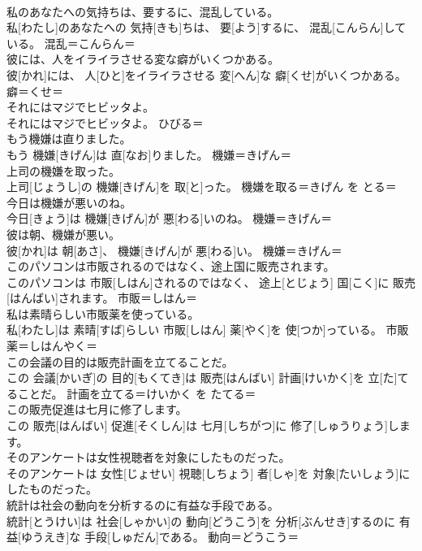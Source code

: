 \documentclass[8pt]{extreport}
\begin{document}
\begin{CJK}{UTF8}{min}
\\	私のあなたへの気持ちは、要するに、混乱している。	
\\	私[わたし]のあなたへの 気持[きも]ちは、 要[よう]するに、 混乱[こんらん]している。	混乱＝こんらん＝ 
\\	彼には、人をイライラさせる変な癖がいくつかある。	
\\	彼[かれ]には、 人[ひと]をイライラさせる 変[へん]な 癖[くせ]がいくつかある。	癖＝くせ＝ 
\\	それにはマジでヒビッタよ。	
\\	それにはマジでヒビッタよ。	ひびる＝ 
\\	もう機嫌は直りました。	
\\	もう 機嫌[きげん]は 直[なお]りました。	機嫌＝きげん＝ 
\\	上司の機嫌を取った。	
\\	上司[じょうし]の 機嫌[きげん]を 取[と]った。	機嫌を取る＝きげん を とる＝ 
\\	今日は機嫌が悪いのね。	
\\	今日[きょう]は 機嫌[きげん]が 悪[わる]いのね。	機嫌＝きげん＝ 
\\	彼は朝、機嫌が悪い。	
\\	彼[かれ]は 朝[あさ]、 機嫌[きげん]が 悪[わる]い。	機嫌＝きげん＝ 
\\	このパソコンは市販されるのではなく、途上国に販売されます。	
\\	このパソコンは 市販[しはん]されるのではなく、 途上[とじょう] 国[こく]に 販売[はんばい]されます。	市販＝しはん＝ 
\\	私は素晴らしい市販薬を使っている。	
\\	私[わたし]は 素晴[すば]らしい 市販[しはん] 薬[やく]を 使[つか]っている。	市販薬＝しはんやく＝ 
\\	この会議の目的は販売計画を立てることだ。	
\\	この 会議[かいぎ]の 目的[もくてき]は 販売[はんばい] 計画[けいかく]を 立[た]てることだ。	計画を立てる＝けいかく を たてる＝ 
\\	この販売促進は七月に修了します。	
\\	この 販売[はんばい] 促進[そくしん]は 七月[しちがつ]に 修了[しゅうりょう]します。	
\\	そのアンケートは女性視聴者を対象にしたものだった。	
\\	そのアンケートは 女性[じょせい] 視聴[しちょう] 者[しゃ]を 対象[たいしょう]にしたものだった。	
\\	統計は社会の動向を分析するのに有益な手段である。	
\\	統計[とうけい]は 社会[しゃかい]の 動向[どうこう]を 分析[ぶんせき]するのに 有益[ゆうえき]な 手段[しゅだん]である。	動向＝どうこう＝ 

\end{CJK}
\end{document}
